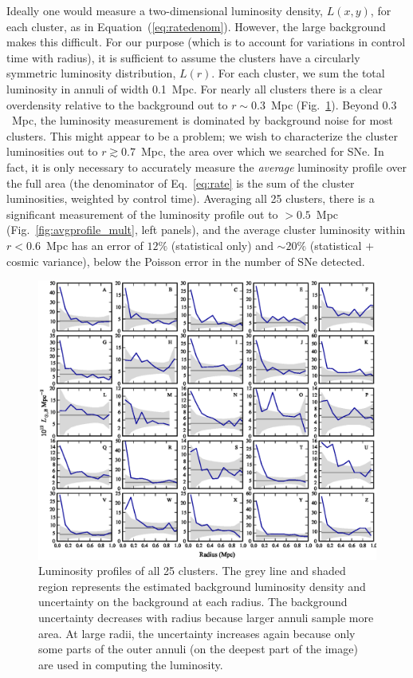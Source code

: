 
Ideally one would measure a two-dimensional luminosity density,
$L(x,y)$, for each cluster, as in Equation~(\ref{eq:ratedenom}).
However, the large background makes this difficult. For our purpose
(which is to account for variations in control time with radius), it
is sufficient to assume the clusters have a circularly symmetric
luminosity distribution, $L(r)$. For each cluster, we sum the total
luminosity in annuli of width 0.1~Mpc. For nearly all clusters there
is a clear overdensity relative to the background out to $r \sim
0.3$~Mpc (Fig.~\ref{fig:allprofiles_all}). Beyond $0.3$~Mpc, the
luminosity measurement is dominated by background noise for most
clusters. This might appear to be a problem; we wish to characterize
the cluster luminosities out to $r \gtrsim 0.7$~Mpc, the area over
which we searched for SNe. In fact, it is only necessary to accurately
measure the \emph{average} luminosity profile over the full area (the
denominator of Eq.~\ref{eq:rate} is the sum of the cluster
luminosities, weighted by control time). Averaging all 25 clusters,
there is a significant measurement of the luminosity profile out to
$>0.5$~Mpc (Fig.~\ref{fig:avgprofile_mult}, left panels), and the
average cluster luminosity within $r<0.6$~Mpc has an error of $12\%$
(statistical only) and $\sim 20\%$ (statistical $+$ cosmic variance),
below the Poisson error in the number of SNe detected.

\begin{figure}[tp]
\includegraphics[angle=270]{figures/clrate/allprofiles_all.eps}
\caption[Luminosity profiles of 25 clusters]{Luminosity profiles
of all 25 clusters. The grey line and shaded region represents the
estimated background luminosity density and uncertainty on the
background at each radius. The background uncertainty decreases
with radius because larger annuli sample more area. At large radii,
the uncertainty increases again because only some parts of the outer
annuli (on the deepest part of the image) are used in computing the
luminosity. \label{fig:allprofiles_all}}
\end{figure}


